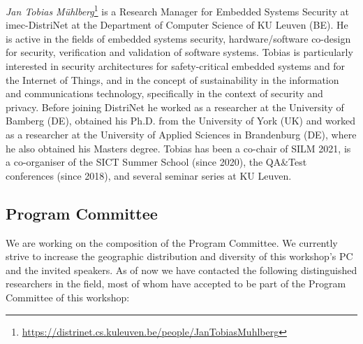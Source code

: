\documentclass[a4paper,11pt]{article} %
\numberwithin{equation}{section} %
\numberwithin{figure}{section} %
\numberwithin{table}{section} %
\begin{document}
\emph{Jan Tobias
M\"uhlberg}\footnote{\url{https://distrinet.cs.kuleuven.be/people/JanTobiasMuhlberg}}
is a Research Manager for Embedded Systems Security at imec-DistriNet at
the Department of Computer Science of KU Leuven (BE). He is active in the
fields of embedded systems security, hardware/software co-design for
security, verification and validation of software systems. Tobias is
particularly interested in security architectures for safety-critical
embedded systems and for the Internet of Things, and in the concept of
sustainability in the information and communications technology,
specifically in the context of security and privacy. Before joining
DistriNet he worked as a researcher at the University of Bamberg (DE),
obtained his Ph.D. from the University of York (UK) and worked as a
researcher at the University of Applied Sciences in Brandenburg (DE), where
he also obtained his Masters degree. Tobias has been a co-chair of SILM
2021, is a co-organiser of the SICT Summer School (since 2020), the
QA\&Test conferences (since 2018), and several seminar series at KU Leuven.

\subsection{Program Committee}

We are working on the composition of the Program Committee. We currently
strive to increase the geographic distribution and diversity of this
workshop's PC and the invited speakers. As of now we have contacted the
following distinguished researchers in the field, most of whom have
accepted to be part of the Program Committee of this workshop:

\end{document}
